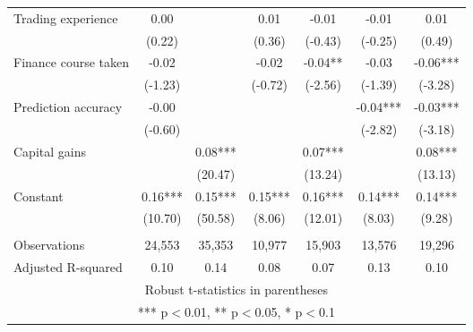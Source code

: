 \documentclass[]{article}
\begin{document}
\begin{tabular}{lcccccc}
Trading experience & 0.00 &  & 0.01 & -0.01 & -0.01 & 0.01 \\
 & (0.22) &  & (0.36) & (-0.43) & (-0.25) & (0.49) \\
Finance course taken & -0.02 &  & -0.02 & -0.04** & -0.03 & -0.06*** \\
 & (-1.23) &  & (-0.72) & (-2.56) & (-1.39) & (-3.28) \\
Prediction accuracy & -0.00 &  &  &  & -0.04*** & -0.03*** \\
 & (-0.60) &  &  &  & (-2.82) & (-3.18) \\
Capital gains &  & 0.08*** &  & 0.07*** &  & 0.08*** \\
 &  & (20.47) &  & (13.24) &  & (13.13) \\
Constant & 0.16*** & 0.15*** & 0.15*** & 0.16*** & 0.14*** & 0.14*** \\
 & (10.70) & (50.58) & (8.06) & (12.01) & (8.03) & (9.28) \\
 &  &  &  &  &  &  \\
Observations & 24,553 & 35,353 & 10,977 & 15,903 & 13,576 & 19,296 \\
 Adjusted R-squared & 0.10 & 0.14 & 0.08 & 0.07 & 0.13 & 0.10 \\ \hline
\multicolumn{7}{c}{ Robust t-statistics in parentheses} \\
\multicolumn{7}{c}{ *** p$<$0.01, ** p$<$0.05, * p$<$0.1} \\
\end{tabular}
\end{document}
